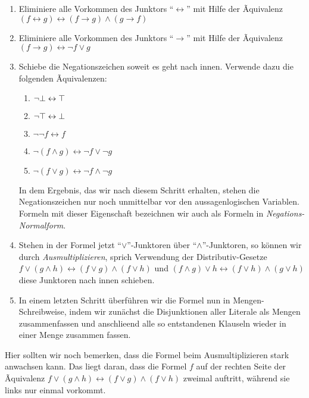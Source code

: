 \begin{enumerate}
\item Eliminiere alle Vorkommen des Junktors ``$\leftrightarrow$'' mit Hilfe der Ãquivalenz \\[0.2cm]
      \hspace*{1.3cm} 
      $(f \leftrightarrow g) \leftrightarrow (f \rightarrow g) \wedge (g \rightarrow f)$
\item Eliminiere alle Vorkommen des Junktors ``$\rightarrow$'' mit Hilfe der Ãquivalenz \\[0.2cm]
      \hspace*{1.3cm} 
      $(f \rightarrow g) \leftrightarrow \neg f \vee g$
\item Schiebe die Negationszeichen soweit es geht nach innen.  Verwende dazu die folgenden Ãquivalenzen:
      \begin{enumerate}
      \item $\neg \bot \leftrightarrow \top$
      \item $\neg \top \leftrightarrow \bot$
      \item $\neg \neg f \leftrightarrow f$
      \item $\neg (f \wedge g) \leftrightarrow  \neg f \vee   \neg g$ 
      \item $\neg (f \vee   g) \leftrightarrow  \neg f \wedge \neg g$ 
      \end{enumerate}
      In dem Ergebnis, das wir nach diesem Schritt erhalten, stehen die Negationszeichen
      nur noch unmittelbar vor den aussagenlogischen Variablen.  Formeln mit dieser
      Eigenschaft bezeichnen wir auch als Formeln in \emph{Negations-Normalform}.
\item Stehen in der Formel jetzt ``$\vee$''-Junktoren \"{u}ber ``$\wedge$''-Junktoren, so k\"{o}nnen wir durch
      \emph{Ausmultiplizieren}, sprich Verwendung der Distributiv-Gesetze \\[0.2cm]
      \hspace*{1.3cm} 
      $f \vee (g \wedge h) \leftrightarrow (f \vee g) \wedge (f \vee h)$ \quad und \quad
      $(f \wedge g) \vee h \leftrightarrow (f \vee h) \wedge (g \vee h)$ 
      \\[0.2cm]
      diese Junktoren nach innen schieben.
\item In einem letzten Schritt \"{u}berf\"{u}hren wir die Formel nun in Mengen-Schreibweise, indem
      wir zun\"{a}chst die Disjunktionen aller Literale als Mengen zusammenfassen und anschlie\3end
      alle so entstandenen Klauseln wieder in einer Menge zusammen fassen.
\end{enumerate}
Hier sollten wir noch bemerken, dass die Formel beim Ausmultiplizieren stark anwachsen kann.
Das liegt daran, dass die Formel $f$ auf der rechten Seite der Ãquivalenz 
$f \vee (g \wedge h) \leftrightarrow (f \vee g) \wedge (f \vee h)$ zweimal auftritt, w\"{a}hrend sie
links nur einmal      vorkommt. 

